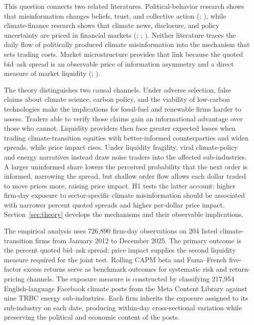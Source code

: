 \documentclass{article}
\theoremstyle{plain}
\begin{document}
This question connects two related literatures. Political-behavior research shows that misinformation changes beliefs, trust, and collective action (\cite{flynn2017misperceptions}; \cite{bursztyn2020misinformation}), while climate-finance research shows that climate news, disclosure, and policy uncertainty are priced in financial markets (\cite{engle2020hedging}; \cite{bolton2021climate}; \cite{pankratz2023climate}). Neither literature traces the daily flow of politically produced climate misinformation into the mechanism that sets trading costs. Market microstructure provides that link because the quoted bid--ask spread is an observable price of information asymmetry and a direct measure of market liquidity (\cite{GlostenMilgrom1985}; \cite{EasleyOHara1992}).

The theory distinguishes two causal channels. Under adverse selection, false claims about climate science, carbon policy, and the viability of low-carbon technologies make the implications for fossil-fuel and renewable firms harder to assess. Traders able to verify those claims gain an informational advantage over those who cannot. Liquidity providers then face greater expected losses when trading climate-transition equities with better-informed counterparties and widen spreads, while price impact rises. Under liquidity fragility, viral climate-policy and energy narratives instead draw noise traders into the affected sub-industries. A larger uninformed share lowers the perceived probability that the next order is informed, narrowing the spread, but shallow order flow allows each dollar traded to move prices more, raising price impact. H1 tests the latter account: higher firm-day exposure to sector-specific climate misinformation should be associated with narrower percent quoted spreads and higher per-dollar price impact. Section~\ref{sec:theory} develops the mechanisms and their observable implications.

The empirical analysis uses 726,890 firm-day observations on 204 listed climate-transition firms from January 2012 to December 2025. The primary outcome is the percent quoted bid--ask spread; price impact supplies the second liquidity measure required for the joint test. Rolling CAPM beta and Fama--French five-factor excess returns serve as benchmark outcomes for systematic risk and return-pricing channels. The exposure measure is constructed by classifying 217,954 English-language Facebook climate posts from the Meta Content Library against nine TRBC energy sub-industries. Each firm inherits the exposure assigned to its sub-industry on each date, producing within-day cross-sectional variation while preserving the political and economic content of the posts.
\end{document}
